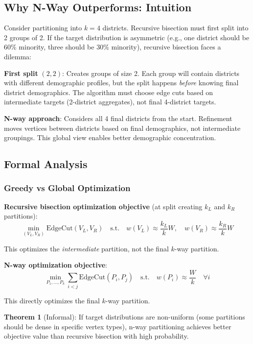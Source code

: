 \subsection{Why N-Way Outperforms: Intuition}

Consider partitioning into $k=4$ districts. Recursive bisection must first split into 2 groups of 2. If the target distribution is asymmetric (e.g., one district should be 60\% minority, three should be 30\% minority), recursive bisection faces a dilemma:

\textbf{First split} $(2,2)$: Creates groups of size 2. Each group will contain districts with different demographic profiles, but the split happens \textit{before} knowing final district demographics. The algorithm must choose edge cuts based on intermediate targets (2-district aggregates), not final 4-district targets.

\textbf{N-way approach}: Considers all 4 final districts from the start. Refinement moves vertices between districts based on final demographics, not intermediate groupings. This global view enables better demographic concentration.

\subsection{Formal Analysis}

\subsubsection{Greedy vs Global Optimization}

\textbf{Recursive bisection optimization objective} (at split creating $k_L$ and $k_R$ partitions):
\begin{equation}
\min_{(V_L, V_R)} \text{EdgeCut}(V_L, V_R) \quad \text{s.t.} \quad w(V_L) \approx \frac{k_L}{k}W, \quad w(V_R) \approx \frac{k_R}{k}W
\end{equation}

This optimizes the \textit{intermediate} partition, not the final $k$-way partition.

\textbf{N-way optimization objective}:
\begin{equation}
\min_{P_1, \ldots, P_k} \sum_{i < j} \text{EdgeCut}(P_i, P_j) \quad \text{s.t.} \quad w(P_i) \approx \frac{W}{k} \quad \forall i
\end{equation}

This directly optimizes the final $k$-way partition.

\textbf{Theorem 1} (Informal): If target distributions are non-uniform (some partitions should be dense in specific vertex types), n-way partitioning achieves better objective value than recursive bisection with high probability.

